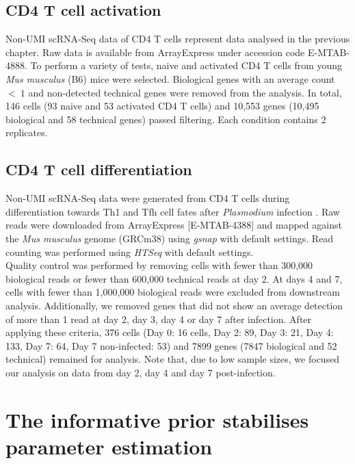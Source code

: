 \subsection{CD4\plus{} T cell activation} \label{seq::data_cd4}

Non-UMI scRNA-Seq data of CD4\plus{} T cells represent data analysed in  the previous chapter. Raw data is available from ArrayExpress under accession code E-MTAB-4888. To perform a variety of tests, naive and activated CD4\plus{} T cells from young \emph{Mus musculus} (B6) mice were selected. Biological genes with an average count $<~1$ and non-detected technical genes were removed from the analysis. In total, 146 cells (93 naive and 53 activated CD4\plus{} T cells) and 10,553 genes (10,495 biological and 58 technical genes) passed filtering. Each condition contains 2 replicates.

\subsection{CD4\plus{} T cell differentiation} \label{seq::data_cd4diff}

Non-UMI scRNA-Seq data were generated from CD4\plus{} T cells during differentiation towards Th1 and Tfh cell fates after \emph{Plasmodium} infection \citep{Lonnberg2017}. Raw reads were downloaded from ArrayExpress [E-MTAB-4388] and mapped against the \emph{Mus musculus} genome (GRCm38) using \emph{gsnap} \citep{Wu2010a} with default settings. Read counting was performed using \emph{HTSeq} \citep{Anders2014} with default settings. \\

Quality control was performed by removing cells with fewer than 300,000 biological reads or fewer than 600,000 technical reads at day 2. At days 4 and 7, cells with fewer than 1,000,000 biological reads were excluded from downstream analysis. Additionally, we removed genes that did not show an average detection of more than 1 read at day 2, day 3, day 4 or day 7 after infection. After applying these criteria, 376 cells (Day 0: 16 cells, Day 2: 89, Day 3: 21, Day 4: 133, Day 7: 64, Day 7 non-infected: 53) and 7899 genes (7847 biological and 52 technical) remained for analysis. Note that, due to low sample sizes, we focused our analysis on data from day 2, day 4 and day 7 post-infection.

\newpage


\section{The informative prior stabilises parameter estimation}
\label{sec2:stabilization}

